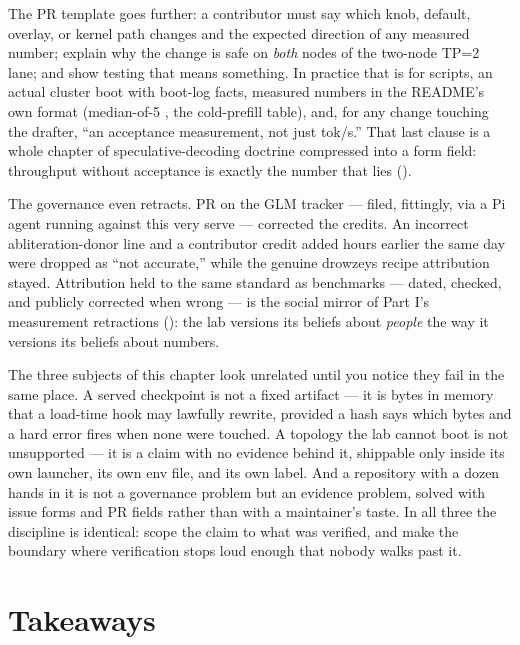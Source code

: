 The PR template goes further: a
contributor must say which knob, default, overlay, or kernel path changes
and the expected direction of any measured number; explain why the change
is safe on \emph{both} nodes of the two-node TP=2 lane; and show testing
that means something. In practice that is  for scripts, an actual
cluster boot with boot-log facts, measured numbers in the README's own
format (median-of-5 , the cold-prefill
table), and, for any change touching the drafter, ``an acceptance
measurement, not just tok/s.'' That last clause is a whole chapter of speculative-decoding
doctrine compressed into a form field: throughput without acceptance is
exactly the number that lies ().

\begin{hbnote}
The governance even retracts. PR  on the GLM tracker --- filed,
fittingly, via a Pi agent running against this very serve --- corrected the
credits. An incorrect abliteration-donor line and a contributor credit
added hours earlier the same day were dropped as ``not accurate,'' while the
genuine drowzeys recipe attribution stayed. Attribution held to the same
standard as benchmarks --- dated, checked, and publicly corrected when
wrong --- is the social mirror of Part I's measurement retractions
(): the lab versions its beliefs about \emph{people} the
way it versions its beliefs about numbers.
\end{hbnote}

\FloatBarrier

The three subjects of this chapter look unrelated until you notice they
fail in the same place. A served checkpoint is not a fixed artifact --- it
is bytes in memory that a load-time hook may lawfully rewrite, provided a
hash says which bytes and a hard error fires when none were touched. A
topology the lab cannot boot is not unsupported --- it is a claim with no
evidence behind it, shippable only inside its own launcher, its own env
file, and its own label. And a repository with a dozen hands in it is not a
governance problem but an evidence problem, solved with issue forms and PR
fields rather than with a maintainer's taste. In all three the discipline
is identical: scope the claim to what was verified, and make the boundary
where verification stops loud enough that nobody walks past it.

\section*{Takeaways}

